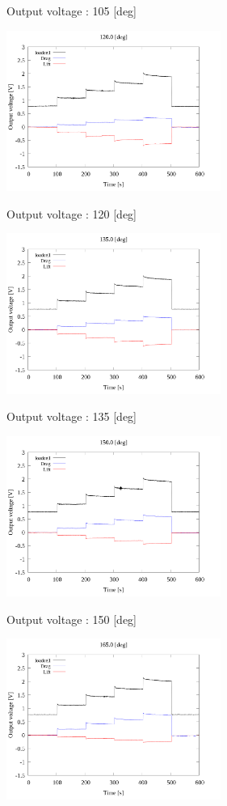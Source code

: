 \begin{multicols}{2}
\begin{figure_here}
\begin{center}
            \caption{Output voltage : 105 [deg]}
            \includegraphics[width=70mm]{../../02_workspace/result/2-1/plot/01-3_allsensors/01_allsensors_1200.png}
            \caption{Output voltage : 120 [deg]}
            \includegraphics[width=70mm]{../../02_workspace/result/2-1/plot/01-3_allsensors/01_allsensors_1350.png}
            \caption{Output voltage : 135 [deg]}
            \includegraphics[width=70mm]{../../02_workspace/result/2-1/plot/01-3_allsensors/01_allsensors_1500.png}
            \caption{Output voltage : 150 [deg]}
            \includegraphics[width=70mm]{../../02_workspace/result/2-1/plot/01-3_allsensors/01_allsensors_1650.png}

\end{center}
\end{figure_here}
\end{multicols}
